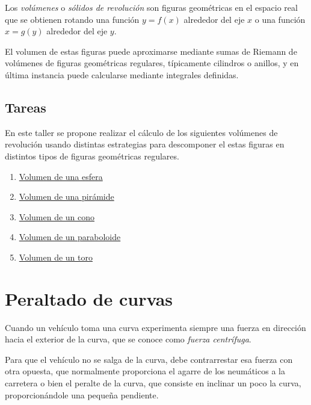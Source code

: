 \documentclass[
  a4paper,
]{scrreport}
\begin{document}
Los \emph{volúmenes} o \emph{sólidos de revolución} son figuras
geométricas en el espacio real que se obtienen rotando una función
\(y=f(x)\) alrededor del eje \(x\) o una función \(x=g(y)\) alrededor
del eje \(y\).

El volumen de estas figuras puede aproximarse mediante sumas de Riemann
de volúmenes de figuras geométricas regulares, típicamente cilindros o
anillos, y en última instancia puede calcularse mediante integrales
definidas.

\hypertarget{tareas-4}{%
\section{Tareas}\label{tareas-4}}

En este taller se propone realizar el cálculo de los siguientes
volúmenes de revolución usando distintas estrategias para descomponer el
estas figuras en distintos tipos de figuras geométricas regulares.

\begin{enumerate}
\def\labelenumi{\arabic{enumi}.}
\item
  \href{https://www.geogebra.org/m/nfdm8xjg}{Volumen de una esfera}
\item
  \href{https://www.geogebra.org/m/g2wu3tqw}{Volumen de una pirámide}
\item
  \href{https://www.geogebra.org/m/vfqyfuxx}{Volumen de un cono}
\item
  \href{https://www.geogebra.org/m/xugkcvn5}{Volumen de un paraboloide}
\item
  \href{https://www.geogebra.org/m/wy2uquqc}{Volumen de un toro}
\end{enumerate}


\hypertarget{peraltado-de-curvas}{%
\chapter{Peraltado de curvas}\label{peraltado-de-curvas}}

Cuando un vehículo toma una curva experimenta siempre una fuerza en
dirección hacia el exterior de la curva, que se conoce como \emph{fuerza
centrífuga}.

Para que el vehículo no se salga de la curva, debe contrarrestar esa
fuerza con otra opuesta, que normalmente proporciona el agarre de los
neumáticos a la carretera o bien el peralte de la curva, que consiste en
inclinar un poco la curva, proporcionándole una pequeña pendiente.
\end{document}

